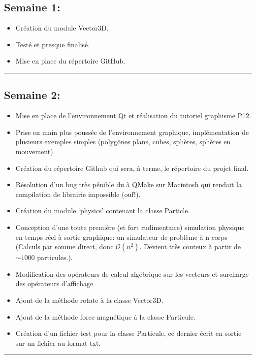 \documentclass[12pt, letterpaper, twoside]{article}
\begin{document}
\subsection{Semaine 1:}
\begin{itemize}
\item Création du module Vector3D.
\item Testé et presque finalisé.
\item Mise en place du répertoire GitHub.
\end{itemize}

\rule{\textwidth}{0.4pt}

\subsection{Semaine 2:}
\begin{itemize}
	\item Mise en place de l’environnement Qt et réalisation du tutoriel graphisme P12.
	\item Prise en main plus poussée de l’environnement graphique, implémentation de plusieurs exemples simples (polygônes plans, cubes, sphères, sphères en mouvement).
	\item Création du répertoire Github qui sera, à terme, le répertoire du projet final.
	\item Résolution d’un bug très pénible du à QMake sur Macintosh qui rendait la compilation de librairie impossible (ouf!).
	\item Création du module `physics' contenant la classe Particle.
	\item Conception d’une toute première (et fort rudimentaire) simulation physique en temps réel à sortie graphique: un simulateur de problème à n corps (Calculs par somme direct, donc $\mathcal{O}(n^2)$. Devient très couteux à partir de $\sim1000$ particules.).
	\item Modification des opérateurs de calcul algébrique sur les vecteurs et surcharge des opérateurs d’affichage
	\item Ajout de la méthode rotate à la classe Vector3D.
	\item Ajout de la méthode force magnétique à la classe Particule.
	\item Création d’un fichier test pour la classe Particule, ce dernier écrit en sortie sur un fichier au format txt.
\end{itemize}

\rule{\textwidth}{0.4pt}
\end{document}

